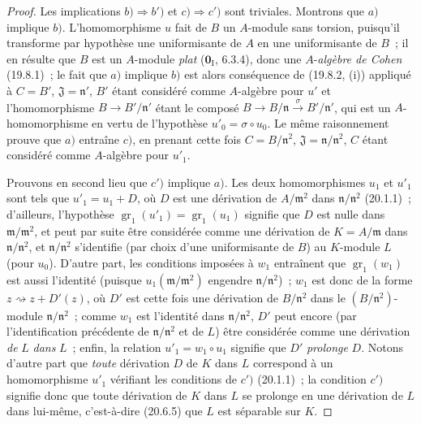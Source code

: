 \begin{proof}
Les implications $b)\Rightarrow b')$ et $c)\Rightarrow c')$ sont triviales.
Montrons que $a)$ implique $b)$.
L'homomorphisme $u$ fait de $B$ un $A$-module sans torsion, puisqu'il
transforme par hypothèse une uniformisante de $A$ en une uniformisante de $B$~;
il en résulte que $B$ est un $A$-module \emph{plat} ($\mathbf{0}_{\mathrm I}$, 6.3.4), donc une
$A$-\emph{algèbre de Cohen} (19.8.1)~; le fait que $a)$ implique $b)$ est alors
 conséquence de (19.8.2, (i)) appliqué à $C=B'$, $\mathfrak J=\mathfrak n'$,
 $B'$ étant considéré comme $A$-algèbre pour $u'$ et l'homomorphisme
$B\to B'/\mathfrak n'$ étant le composé
$B\to B/\mathfrak n\xrightarrow{\sigma}B'/\mathfrak n'$, qui est un $A$-homomorphisme en
 vertu de l'hypothèse $u'_0=\sigma\circ u_0$. Le même raisonnement prouve que
$a)$ entraîne $c)$, en prenant cette fois $C=B/\mathfrak n^2$,
$\mathfrak J=\mathfrak n/\mathfrak n^2$, $C$ étant considéré comme
$A$-algèbre pour $u'_1$.

Prouvons en second lieu que $c')$ implique $a)$. Les deux homomorphismes
$u_1$ et $u'_1$ sont tels que $u'_1=u_1+D$, où $D$ est une dérivation de
$A/\mathfrak m^2$ dans $\mathfrak n/\mathfrak n^2$ (20.1.1)~; d'ailleurs,
l'hypothèse $\operatorname{gr}_1(u'_1)=\operatorname{gr}_1(u_1)$ signifie
que $D$ est nulle dans $\mathfrak m/\mathfrak m^2$, et peut par suite être
considérée comme une dérivation de $K=A/\mathfrak m$ dans
$\mathfrak n/\mathfrak n^2$, et $\mathfrak n/\mathfrak n^2$ s'identifie
(par choix d'une uniformisante de $B$) au $K$-module $L$ (pour $u_0$).
D'autre part, les conditions imposées à $w_1$ entraînent que
 $\operatorname{gr}_1(w_1)$ est aussi l'identité (puisque
 $u_1(\mathfrak m/\mathfrak m^2)$ engendre
$\mathfrak n/\mathfrak n^2$)~; $w_1$ est donc de la forme
$z\rightsquigarrow z+D'(z)$, où $D'$ est cette fois une dérivation de
$B/\mathfrak n^2$ dans le $(B/\mathfrak n^2)$-module
$\mathfrak n/\mathfrak n^2$~; comme $w_1$ est l'identité dans
$\mathfrak n/\mathfrak n^2$, $D'$ peut encore (par l'identification
précédente de $\mathfrak n/\mathfrak n^2$ et de $L$) être considérée comme
une dérivation \emph{de} $L$ \emph{dans} $L$~; enfin, la relation $u'_1=w_1\circ u_1$
signifie que $D'$ \emph{prolonge} $D$. Notons d'autre part que \emph{toute} dérivation $D$
de $K$ dans $L$ correspond à un homomorphisme $u'_1$ vérifiant les conditions
de $c')$ (20.1.1)~; la condition $c')$ signifie donc que toute dérivation de
$K$ dans $L$ se prolonge en une dérivation de $L$ dans lui-même, c'est-à-dire
(20.6.5) que $L$ est séparable sur $K$.


\end{proof}
